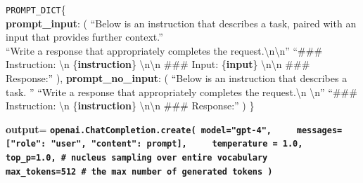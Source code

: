 \begin{algorithm}[t!]
  \caption{Pseudo code for prompt engineering, GPT-4 call and hyper-parameters in data generation. Each instruction instance is used as variables in the prompt template, the data flow is highlighted in blue.}
  \label{alg:gpt4}

\texttt{PROMPT\_DICT}\{ \\
    \textnormal{\textcolor{blue!90!black}{\ttfamily\bfseries prompt\_input}}\unskip: ( \;
        ``Below is an instruction that describes a task, paired with an input that provides further context.'' \\
        ``Write a response that appropriately completes the request.\textbackslash n\textbackslash n'' \;
         ``\#\#\# Instruction: \textbackslash n \{\textnormal{\textcolor{blue!90!black}{\ttfamily\bfseries instruction}}\unskip\}
        \textbackslash n\textbackslash n \#\#\# Input: \{\textnormal{\textcolor{blue!90!black}{\ttfamily\bfseries input}}\unskip\}
        \textbackslash n\textbackslash n \#\#\# Response:'' \;         
    ), \;
    \textnormal{\textcolor{blue!90!black}{\ttfamily\bfseries prompt\_no\_input}}\unskip: ( \;
        ``Below is an instruction that describes a task. '' \;
        ``Write a response that appropriately completes the request.\textbackslash n \textbackslash n'' \;
        ``\#\#\# Instruction: \textbackslash n \{\textnormal{\textcolor{blue!90!black}{\ttfamily\bfseries instruction}}\unskip\} \textbackslash  n\textbackslash n \#\#\# Response:'' 
    )\;
    \}

\textnormal{\textcolor{blue!90!black}{\ttfamily\bfseries output}}\unskip = \texttt{\bfseries openai.ChatCompletion.create( \;
     \texttt{model="gpt-4"}, \;
     \texttt{messages=[{"role": "user", "content": \textnormal{\textcolor{blue!90!black}{\ttfamily\bfseries prompt}}\unskip}]}, \;
     \texttt{temperature = 1.0}, \;
     \texttt{top\_p=1.0},  \textnormal{\ttfamily\color{green!50!black}\# nucleus sampling over entire vocabulary}\unskip \;
     \texttt{max\_tokens=512}  \textnormal{\ttfamily\color{green!50!black}\#  the max number of generated tokens}\unskip \;
    )}
\end{algorithm}

